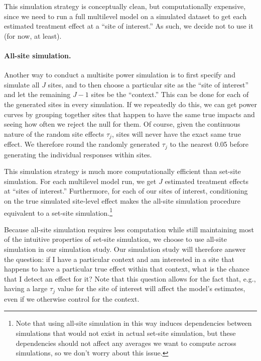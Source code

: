 \documentclass[]{article}
\begin{document}
This simulation strategy is conceptually clean, but computationally expensive, since we need to run a full multilevel model on a simulated dataset to get each estimated treatment effect at a ``site of interest.''
As such, we decide not to use it (for now, at least).

\paragraph{All-site simulation.} Another way to conduct a multisite power simulation is to first specify and simulate all $J$ sites, and to then choose a particular site as the ``site of interest'' and let the remaining $J-1$ sites be the ``context.''
This can be done for each of the generated sites in every simulation.
If we repeatedly do this, we can get power curves by grouping together sites that happen to have the same true impacts and seeing how often we reject the null for them.
Of course, given the continuous nature of the random site effects $\tau_j$, sites will never have the exact same true effect.
We therefore round the randomly generated $\tau_j$ to the nearest 0.05 before generating the individual responses within sites.

This simulation strategy is much more computationally efficient than set-site simulation.
For each multilevel model run, we get $J$ estimated treatment effects at ``sites of interest.''
Furthermore, for each of our sites of interest, conditioning on the true simulated site-level effect makes the all-site simulation procedure equivalent to a set-site simulation.\footnote{Note that using all-site simulation in this way induces dependencies between simulations that would not exist in actual set-site simulation, but these dependencies should not affect any averages we want to compute across simulations, so we don't worry about this issue.}

Because all-site simulation requires less computation while still maintaining most of the intuitive properties of set-site simulation, we choose to use all-site simulation in our simulation study.
Our simulation study will therefore answer the question: if I have a particular context and am interested in a site that happens to have a particular true effect within that context, what is the chance that I detect an effect for it?
Note that this question allows for the fact that, e.g., having a large $\tau_j$ value for the site of interest will affect the model's estimates, even if we otherwise control for the context.
\end{document}
